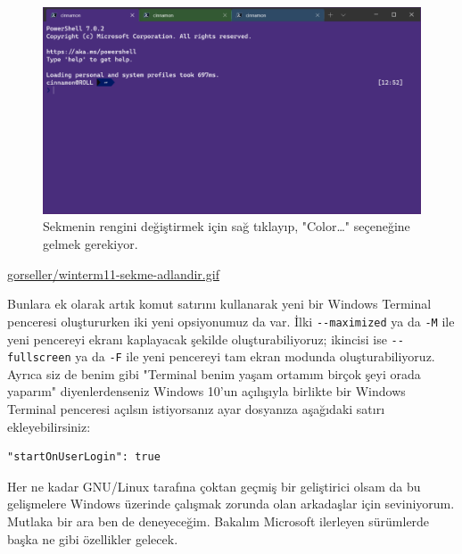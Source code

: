 \documentclass[11pt]{article}
\begin{document}
\begin{figure}[htbp]
\centering
\includegraphics[width=.9\linewidth]{gorseller/winterm11-sekme-renk.png}
\caption{Sekmenin rengini değiştirmek için sağ tıklayıp, "Color\ldots{}" seçeneğine gelmek gerekiyor.}
\end{figure}
\newpage

\url{gorseller/winterm11-sekme-adlandir.gif}

Bunlara ek olarak artık komut satırını kullanarak yeni bir Windows Terminal
penceresi oluştururken iki yeni opsiyonumuz da var. İlki \texttt{-{}-maximized} ya da
\texttt{-M} ile yeni pencereyi ekranı kaplayacak şekilde oluşturabiliyoruz; ikincisi
ise \texttt{-{}-fullscreen} ya da \texttt{-F} ile yeni pencereyi tam ekran modunda
oluşturabiliyoruz. Ayrıca siz de benim gibi "Terminal benim yaşam ortamım
birçok şeyi orada yaparım" diyenlerdenseniz Windows 10'un açılışıyla birlikte
bir Windows Terminal penceresi açılsın istiyorsanız ayar dosyanıza aşağıdaki
satırı ekleyebilirsiniz:
\begin{verbatim}
"startOnUserLogin": true
\end{verbatim}

Her ne kadar GNU/Linux tarafına çoktan geçmiş bir geliştirici olsam da bu
gelişmelere Windows üzerinde çalışmak zorunda olan arkadaşlar için
seviniyorum. Mutlaka bir ara ben de deneyeceğim. Bakalım Microsoft ilerleyen
sürümlerde başka ne gibi özellikler gelecek.
\newpage
\end{document}
